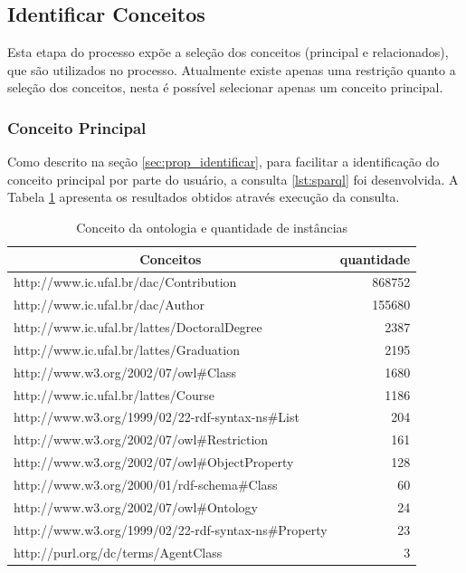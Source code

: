 \subsection{Identificar Conceitos}
Esta etapa do processo expõe a seleção dos conceitos (principal e relacionados), que são utilizados no processo. Atualmente existe apenas uma restrição quanto a seleção dos conceitos, nesta é possível selecionar apenas um conceito principal.

\subsubsection{Conceito Principal}
Como descrito na seção \ref{sec:prop_identificar}, para facilitar a identificação do conceito principal por parte do usuário, a consulta \ref{lst:sparql} foi desenvolvida. A Tabela \ref{tab:estudo_sparql1} apresenta os resultados obtidos através execução da consulta. 

\begin{table}[h]
	\centering
	\caption{Conceito da ontologia e quantidade de instâncias}
	\label{tab:estudo_sparql1}
	\begin{tabular}{@{}|l|r|@{}}
		\hline
		\multicolumn{1}{|c|}{\textbf{Conceitos}}               & \multicolumn{1}{c|}{\textbf{quantidade}} \\ \hline
		http://www.ic.ufal.br/dac/Contribution               & 868752                              \\ \hline
		http://www.ic.ufal.br/dac/Author                     & 155680                              \\ \hline
		http://www.ic.ufal.br/lattes/DoctoralDegree          & 2387                                \\ \hline
		http://www.ic.ufal.br/lattes/Graduation              & 2195                                \\ \hline
		http://www.w3.org/2002/07/owl\#Class                 & 1680                                \\ \hline
		http://www.ic.ufal.br/lattes/Course                  & 1186                                \\ \hline
		http://www.w3.org/1999/02/22-rdf-syntax-ns\#List     & 204                                 \\ \hline
		http://www.w3.org/2002/07/owl\#Restriction           & 161                                 \\ \hline
		http://www.w3.org/2002/07/owl\#ObjectProperty        & 128                                 \\ \hline
		http://www.w3.org/2000/01/rdf-schema\#Class          & 60                                  \\ \hline
		http://www.w3.org/2002/07/owl\#Ontology              & 24                                  \\ \hline
		http://www.w3.org/1999/02/22-rdf-syntax-ns\#Property & 23                                  \\ \hline
		http://purl.org/dc/terms/AgentClass                  & 3                                   \\ \hline
	\end{tabular}
\end{table}

